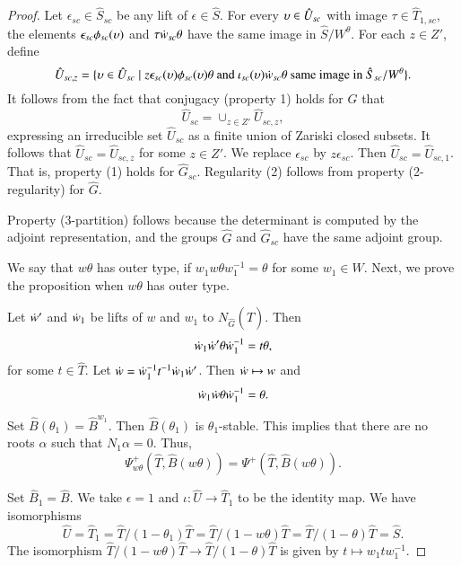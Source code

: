 \begin{proof}
Let $\epsilon_{sc}\in \hat S_{sc}$ be any lift of
$\epsilon\in \hat S$.  For every $\upsilon\in \hat U_{sc}$ with image
$\tau\in \hat T_{1,sc}$, the elements $\epsilon_{sc}\phi_{sc}(\upsilon)$
and $\tau\dot w_{sc}\theta$ have the same image in $\hat S/W^\theta$.
For each $z\in Z'$, define
\[
\hat U_{sc,z} = \{\upsilon \in \hat U_{sc}\mid 
z \epsilon_{sc}(\upsilon)\phi_{sc}(\upsilon)\theta\text{ and }
\iota_{sc}(\upsilon)\dot w_{sc}\theta \text{ same image in } \hat S_{sc}/W^\theta\}.
\]
 It follows from
the fact that conjugacy (property 1) holds for $\hat G$ that
\[
\hat U_{sc} = \cup_{z\in Z'} \hat U_{sc,z},
\]
expressing an irreducible set $\hat U_{sc}$ as a finite union of
Zariski closed subsets.  It follows that $\hat U_{sc} = \hat U_{sc,z}$
for some $z\in Z'$.  We replace $\epsilon_{sc}$ by $z\epsilon_{sc}$.
Then $\hat U_{sc} = \hat U_{sc,1}$.  That is, property (1) holds for
$\hat G_{sc}$.  Regularity (2) follows from property (2-regularity)
for $\hat G$.

Property (3-partition) follows because the determinant
is computed by the adjoint representation,  and the groups $\hat G$
and $\hat G_{sc}$ have the same adjoint group.


We say that $w\theta$ has outer type, if $w_1 w \theta
w_1^{-1}=\theta$ for some $w_1\in W$.  Next, we prove the proposition
when $w\theta$ has outer type.

Let $\dot w'$ and $\dot w_1$ be lifts of $w$ and $w_1$ to $N_{\hat
  G}(\hat T)$.  Then
\[
\dot w_1 \dot w' \theta\dot w_1^{-1} = t\theta,
\]
for some $t\in \hat T$.  Let $\dot w = \dot w_1^{-1} t^{-1}
\dot w_1\dot w'$.  Then $\dot w\mapsto w$ and
\begin{equation}\label{eqn:outer}
\dot w_1\dot w \theta\dot w_1^{-1} = \theta.
\end{equation}

Set $\hat B(\theta_1) = \hat B^{w_1}$.  Then $\hat B(\theta_1)$ is
$\theta_1$-stable.  This implies that there are no roots $\alpha$ such
that $N_1\alpha=0$.  Thus,
\[
\Psi_{w\theta}^+(\hat T,\hat B(w\theta)) = 
\Psi^+(\hat T,\hat B(w\theta)).
\]

Set $\hat B_1 = \hat B$.  We take $\epsilon=1$ and $\iota:\hat
U\to\hat T_1$ to be the identity map.  We have isomorphisms
\begin{equation}
\hat U = \hat T_1 = \hat T/(1-\theta_1) \hat T 
= \hat T/(1-w \theta)\hat T 
= \hat T/(1-\theta)\hat T = \hat S.
\end{equation}
The isomorphism $\hat T/(1-w \theta)\hat T\to \hat T/(1-\theta)\hat T$
is given by $t \mapsto w_1 t w_1^{-1}$.


\end{proof}

